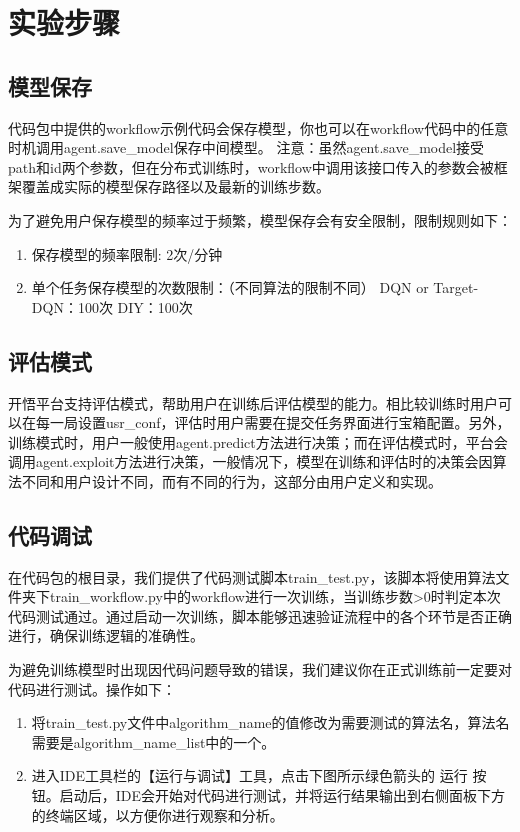 \section{实验步骤}

\subsection{模型保存}

代码包中提供的workflow示例代码会保存模型，你也可以在workflow代码中的任意时机调用agent.save\_model保存中间模型。 注意：虽然agent.save\_model接受path和id两个参数，但在分布式训练时，workflow中调用该接口传入的参数会被框架覆盖成实际的模型保存路径以及最新的训练步数。

为了避免用户保存模型的频率过于频繁，模型保存会有安全限制，限制规则如下：

\begin{enumerate}
    \item 保存模型的频率限制: 2次/分钟
    \item
    单个任务保存模型的次数限制：（不同算法的限制不同）
    DQN or Target-DQN：100次
    DIY：100次
\end{enumerate}

\subsection{评估模式}

开悟平台支持评估模式，帮助用户在训练后评估模型的能力。相比较训练时用户可以在每一局设置usr\_conf，评估时用户需要在提交任务界面进行宝箱配置。另外，训练模式时，用户一般使用agent.predict方法进行决策；而在评估模式时，平台会调用agent.exploit方法进行决策，一般情况下，模型在训练和评估时的决策会因算法不同和用户设计不同，而有不同的行为，这部分由用户定义和实现。


\subsection{代码调试}

在代码包的根目录，我们提供了代码测试脚本train\_test.py，该脚本将使用算法文件夹下train\_workflow.py中的workflow进行一次训练，当训练步数>0时判定本次代码测试通过。通过启动一次训练，脚本能够迅速验证流程中的各个环节是否正确进行，确保训练逻辑的准确性。

为避免训练模型时出现因代码问题导致的错误，我们建议你在正式训练前一定要对代码进行测试。操作如下：

\begin{enumerate}
    \item 将train\_test.py文件中algorithm\_name的值修改为需要测试的算法名，算法名需要是algorithm\_name\_list中的一个。
    
    \item 进入IDE工具栏的【运行与调试】工具，点击下图所示绿色箭头的 运行 按钮。启动后，IDE会开始对代码进行测试，并将运行结果输出到右侧面板下方的终端区域，以方便你进行观察和分析。
\end{enumerate}


